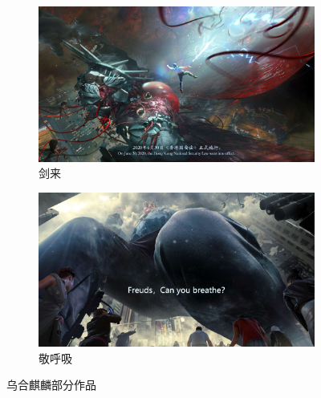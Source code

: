\documentclass[zihao = -4, linespread = 1.5]{ctexart} %
\begin{document}
\begin{figure}[htbp]
     \begin{subfigure}[b]{.5\linewidth - 1mm}
         \centering
         \includegraphics[width=\textwidth]{picture/剑来.jpg}
         \caption{剑来}
         \label{fig:JianLai}
     \end{subfigure}
     \hfill
     \begin{subfigure}[b]{.5\linewidth - 1mm}
         \centering
         \includegraphics[width=\textwidth]{picture/敬呼吸.jpg}
         \caption{敬呼吸}
         \label{fig:JingHuXi}
     \end{subfigure}

        \caption{乌合麒麟部分作品}
        \label{fig:WuHeQiLin}
\end{figure}



\clearpage
\end{document}
